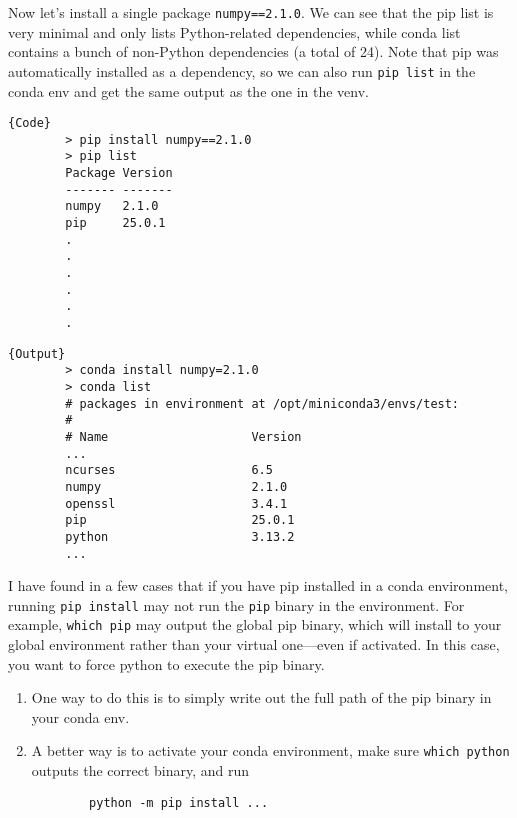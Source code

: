   \begin{example}
    Now let's install a single package \texttt{numpy==2.1.0}. We can see that the pip list is very minimal and only lists Python-related dependencies, while conda list contains a bunch of non-Python dependencies (a total of 24). Note that pip was automatically installed as a dependency, so we can also run \texttt{pip list} in the conda env and get the same output as the one in the venv.  
    
    \noindent\begin{minipage}{.35\textwidth}
      \begin{lstlisting}[]{Code} 
        > pip install numpy==2.1.0
        > pip list
        Package Version
        ------- -------
        numpy   2.1.0
        pip     25.0.1
        .
        .
        .
        .
        .
        .
      \end{lstlisting}
      \end{minipage}
      \hfill
      \begin{minipage}{.64\textwidth}
      \begin{lstlisting}[]{Output}
        > conda install numpy=2.1.0
        > conda list
        # packages in environment at /opt/miniconda3/envs/test:
        #
        # Name                    Version      
        ...
        ncurses                   6.5         
        numpy                     2.1.0       
        openssl                   3.4.1       
        pip                       25.0.1      
        python                    3.13.2      
        ...
      \end{lstlisting}
    \end{minipage}
  \end{example}

  \begin{example}[Warning]
    I have found in a few cases that if you have pip installed in a conda environment, running \texttt{pip install} may not run the \texttt{pip} binary in the environment. For example, \texttt{which pip} may output the global pip binary, which will install to your global environment rather than your virtual one---even if activated. In this case, you want to force python to execute the pip binary. 
    \begin{enumerate}
      \item One way to do this is to simply write out the full path of the pip binary in your conda env. 
      \item A better way is to activate your conda environment, make sure \texttt{which python} outputs the correct binary, and run 
      \begin{lstlisting}
        python -m pip install ...
      \end{lstlisting}
    \end{enumerate}
  \end{example}

